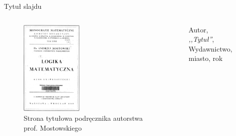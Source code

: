 \documentclass[11pt]{beamer}
\begin{document}
\begin{frame}{Tytuł slajdu}
\begin{minipage}[0.5\textheight]{\textwidth}
\begin{columns}[T]
\begin{column}{0.5\textwidth}
\begin{figure}
\centering
\captionsetup{justification=centering}
\captionsetup{labelformat=empty}
\includegraphics[width=3cm]{logika_matematyczna}
\caption{{\tiny Strona tytułowa podręcznika autorstwa prof. Mostowskiego}}
\end{figure}
\end{column}

\begin{column}{0.5\textwidth}
\vspace{5mm}
Autor, \\{\it ,,Tytuł''}, \\Wydawnictwo, miasto, rok \\


\end{column}

\end{columns}
\end{minipage}

\end{frame}
\end{document}
